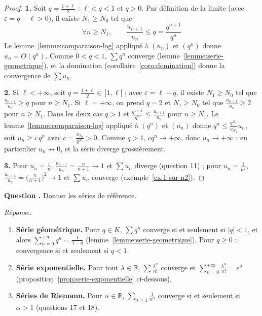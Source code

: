 \documentclass[11pt]{article}
\newcounter{qnum}
\newcommand{\question}[1]{%
\stepcounter{qnum}%
\bigskip
\noindent\textbf{Question \theqnum.} #1\par}
\newcommand{\reponse}{\noindent\textit{Réponse.}\ }
\begin{document}
\begin{proof}
\textbf{1.} Soit $q=\frac{1+\ell}{2}$ : $\ell<q<1$ et $q>0$. Par définition de la limite (avec $\varepsilon=q-\ell>0$), il existe $N_1\geq N_0$ tel que
\[\forall n\geq N_1,\qquad\frac{u_{n+1}}{u_n}\leq q=\frac{q^{n+1}}{q^n}\]
Le lemme~\ref{lemme:comparaison-log} appliqué à $(u_n)$ et $(q^n)$ donne $u_n=O(q^n)$. Comme $0<q<1$, $\sum q^n$ converge (lemme~\ref{lemme:serie-geometrique}), et la domination (corollaire~\ref{coro:domination}) donne la convergence de $\sum u_n$.

\textbf{2.} Si $\ell<+\infty$, soit $q=\frac{1+\ell}{2}\in\,]1,\ell[$ ; avec $\varepsilon=\ell-q$, il existe $N_1\geq N_0$ tel que $\frac{u_{n+1}}{u_n}\geq q$ pour $n\geq N_1$. Si $\ell=+\infty$, on prend $q=2$ et $N_1\geq N_0$ tel que $\frac{u_{n+1}}{u_n}\geq 2$ pour $n\geq N_1$. Dans les deux cas $q>1$ et $\frac{q^{n+1}}{q^n}\leq\frac{u_{n+1}}{u_n}$ pour $n\geq N_1$. Le lemme~\ref{lemme:comparaison-log} appliqué à $(q^n)$ et $(u_n)$ donne $q^n\leq\frac{q^{N_1}}{u_{N_1}}u_n$, soit $u_n\geq c\,q^n$ avec $c=\frac{u_{N_1}}{q^{N_1}}>0$. Comme $q>1$, $cq^n\to+\infty$, donc $u_n\to+\infty$ : en particulier $u_n\not\to 0$, et la série diverge grossièrement.

\textbf{3.} Pour $u_n=\frac1n$, $\frac{u_{n+1}}{u_n}=\frac{n}{n+1}\to 1$ et $\sum u_n$ diverge (question 11) ; pour $u_n=\frac{1}{n^2}$, $\frac{u_{n+1}}{u_n}=\big(\frac{n}{n+1}\big)^2\to 1$ et $\sum u_n$ converge (exemple~\ref{ex:1-sur-n2}).
\end{proof}

\question{Donner les séries de référence.}
\reponse
\begin{enumerate}
\item \textbf{Série géométrique.} Pour $q\in K$, $\sum q^n$ converge si et seulement si $|q|<1$, et alors $\sum_{n=0}^{+\infty}q^n=\frac{1}{1-q}$ (lemme~\ref{lemme:serie-geometrique}). Pour $q\geq 0$ : convergence si et seulement si $q<1$.
\item \textbf{Série exponentielle.} Pour tout $\lambda\in\mathbb{R}$, $\sum\frac{\lambda^n}{n!}$ converge et $\sum_{n=0}^{+\infty}\frac{\lambda^n}{n!}=e^\lambda$ (proposition~\ref{prop:serie-exponentielle} ci-dessous).
\item \textbf{Séries de Riemann.} Pour $\alpha\in\mathbb{R}$, $\sum_{n\geq1}\frac{1}{n^\alpha}$ converge si et seulement si $\alpha>1$ (questions 17 et 18).
\end{enumerate}
\end{document}
